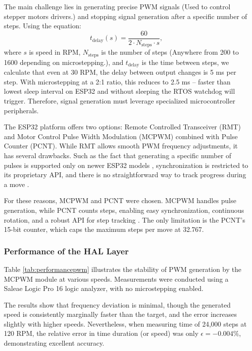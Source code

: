 The main challenge lies in generating precise PWM signals (Used to control stepper motors drivers.) and stopping signal generation after a specific number of steps.
Using the equation:
%
\begin{equation}
  t_{\mathrm{delay}}(s) = \frac{60}{2\cdot N_{\mathrm{steps}} \cdot s},
  \label{eq:delay}
\end{equation}
%
where $s$ is speed in RPM, $N_{\mathrm{steps}}$ is the number of steps (Anywhere from 200 to 1600 depending on microstepping.), and $t_{\mathrm{delay}}$ is the time between steps, we calculate that even at 30 RPM, the delay between output changes is 5 ms per step.
With microstepping at a 2:1 ratio, this reduces to 2.5 ms -- faster than lowest sleep interval on ESP32 and without sleeping the RTOS watchdog will trigger.
Therefore, signal generation must leverage specialized microcontroller peripherals.

The ESP32 platform offers two options: Remote Controlled Transceiver (RMT) and Motor Control Pulse Width Modulation (MCPWM) combined with Pulse Counter (PCNT).
While RMT allows smooth PWM frequency adjustments, it has several drawbacks.
Such as the fact that generating a specific number of pulses is supported only on newer ESP32 models \cite{gitRMT}, synchronization is restricted to its proprietary API, and there is no straightforward way to track progress during a move \cite{espRMT}.

For these reasons, MCPWM and PCNT were chosen.
MCPWM handles pulse generation, while PCNT counts steps, enabling easy synchronization, continuous rotation, and a robust API for step tracking \cite{espPCNT}.
The only limitation is the PCNT’s 15-bit counter, which caps the maximum steps per move at 32.767.


\subsubsection{Performance of the HAL Layer}

Table \ref{tab:performancepwm} illustrates the stability of PWM generation by the MCPWM module at various speeds.
Measurements were conducted using a Saleae Logic Pro 16 logic analyzer, with no microstepping enabled.

The results show that frequency deviation is minimal, though the generated speed is consistently marginally faster than the target, and  the error increases slightly with higher speeds.
Nevertheless, when measuring time of 24,000 steps at 120 RPM, the relative error in time duration (or speed) was only $\epsilon = -0.004\%$, demonstrating excellent accuracy.


